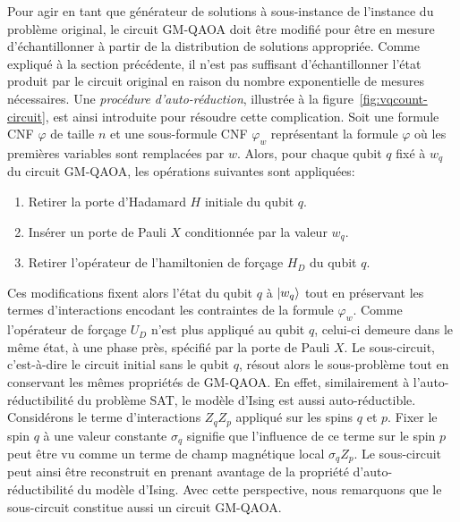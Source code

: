Pour agir en tant que générateur de solutions à sous-instance de l'instance du problème original, le circuit GM-QAOA doit être modifié pour être en mesure d'échantillonner à partir de la distribution de solutions appropriée. Comme expliqué à la section précédente, il n'est pas suffisant d'échantillonner l'état produit par le circuit original en raison du nombre exponentielle de mesures nécessaires. Une \textit{procédure d'auto-réduction}, illustrée à la figure~\ref{fig:vqcount-circuit}, est ainsi introduite pour résoudre cette complication. Soit une formule CNF $\varphi$ de taille $n$ et une sous-formule CNF $\varphi_{w}$ représentant la formule $\varphi$ où les premières variables sont remplacées par $w$. Alors, pour chaque qubit $q$ fixé à $w_{q}$ du circuit GM-QAOA, les opérations suivantes sont appliquées:

\begin{enumerate}[(1)]
    \item Retirer la porte d'Hadamard $H$ initiale du qubit $q$.
    \item Insérer un porte de Pauli $X$ conditionnée par la valeur $w_{q}$.
    \item Retirer l'opérateur de l'hamiltonien de forçage $H_{D}$ du qubit $q$.
\end{enumerate}

Ces modifications fixent alors l'état du qubit $q$ à $\ket{w_{q}}$ tout en préservant les termes d'interactions encodant les contraintes de la formule $\varphi_{w}$. Comme l'opérateur de forçage $U_{D}$ n'est plus appliqué au qubit $q$, celui-ci demeure dans le même état, à une phase près, spécifié par la porte de Pauli $X$. Le sous-circuit, c'est-à-dire le circuit initial sans le qubit $q$, résout alors le sous-problème tout en conservant les mêmes propriétés de GM-QAOA. En effet, similairement à l'auto-réductibilité du problème SAT, le modèle d'Ising est aussi auto-réductible. Considérons le terme d'interactions $Z_{q}Z_{p}$ appliqué sur les spins $q$ et $p$. Fixer le spin $q$ à une valeur constante $\sigma_{q}$ signifie que l'influence de ce terme sur le spin $p$ peut être vu comme un terme de champ magnétique local $\sigma_{q} Z_{p}$. Le sous-circuit peut ainsi être reconstruit en prenant avantage de la propriété d'auto-réductibilité du modèle d'Ising. Avec cette perspective, nous remarquons que le sous-circuit constitue aussi un circuit GM-QAOA.     

